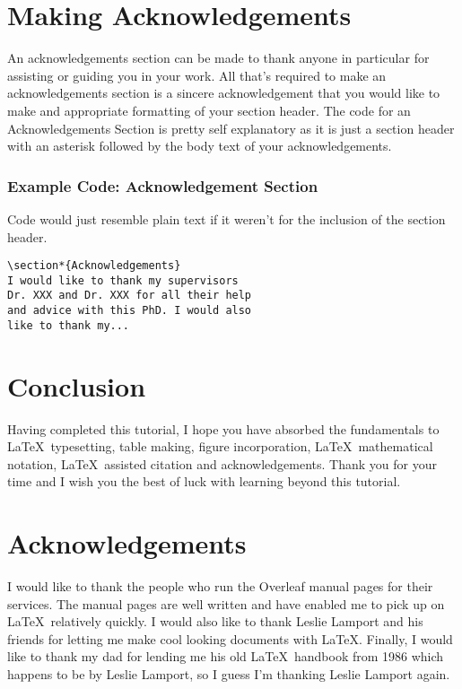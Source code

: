 \documentclass[12pt,journal,compsoc]{IEEEtran}
\begin{document}
\section{Making Acknowledgements}
An acknowledgements section can be made to thank anyone in particular for assisting or guiding you in your work. All that's required to make an acknowledgements section is a sincere acknowledgement that you would like to make and appropriate formatting of your section header. The code for an Acknowledgements Section is pretty self explanatory as it is just a section header with an asterisk followed by the body text of your acknowledgements.

\subsubsection*{Example Code: Acknowledgement Section}
Code would just resemble plain text if it weren't for the inclusion of the section header.
\begin{center}
\begin{verbatim}
\section*{Acknowledgements}
I would like to thank my supervisors 
Dr. XXX and Dr. XXX for all their help 
and advice with this PhD. I would also 
like to thank my...
\end{verbatim}
\end{center}
\cite{discov:exAck}

\section{Conclusion}
Having completed this tutorial, I hope you have absorbed the fundamentals to \LaTeX\ typesetting, table making, figure incorporation, \LaTeX\ mathematical notation, \LaTeX\ assisted citation and acknowledgements. Thank you for your time and I wish you the best of luck with learning beyond this tutorial.

\section*{Acknowledgements}
I would like to thank the people who run the Overleaf manual pages for their services. The manual pages are well written and have enabled me to pick up on \LaTeX\ relatively quickly. I would also like to thank Leslie Lamport and his friends for letting me make cool looking documents with \LaTeX\/. Finally, I would like to thank my dad for lending me his old \LaTeX\ handbook from 1986 which happens to be by Leslie Lamport, so I guess I'm thanking Leslie Lamport again.
\end{document}
